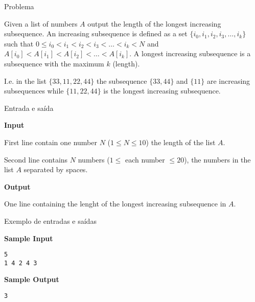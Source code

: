 
\begin{frame}[fragile]{Problema}

Given a list of numbers $A$ output the length of the longest increasing subsequence. An 
increasing subsequence is defined as a set $\{i_0, i_1, i_2, i_3, \ldots, i_k\}$ such that 
$0 \leq i_0 < i_1 < i_2 < i_3 < \ldots < i_k < N$ and $A[i_0] < A[i_1] < A[i_2] < \ldots < 
A[i_k]$. A longest increasing subsequence is a subsequence with the maximum $k$ (length).

I.e. in the list $\{33 , 11 , 22 , 44\}$ the subsequence $\{33 , 44\}$ and $\{11\}$ are
increasing subsequences while $\{11 , 22 , 44\}$ is the longest increasing subsequence.

\end{frame}

\begin{frame}[fragile]{Entrada e saída}

\textbf{Input}

First line contain one number $N$ ($1\leq N\leq 10$) the length of the list $A$.

Second line contains $N$ numbers ($1 \leq$ each number $\leq 20$), the numbers in the list $A$
separated by spaces.

\vspace{0.2in}

\textbf{Output}

One line containing the lenght of the longest increasing subsequence in $A$.

\end{frame}

\begin{frame}[fragile]{Exemplo de entradas e saídas}

\begin{minipage}[t]{0.45\textwidth}
\textbf{Sample Input}
\begin{verbatim}
5
1 4 2 4 3
\end{verbatim}
\end{minipage}
\begin{minipage}[t]{0.5\textwidth}
\textbf{Sample Output}
\begin{verbatim}
3
\end{verbatim}
\end{minipage}

\end{frame}

